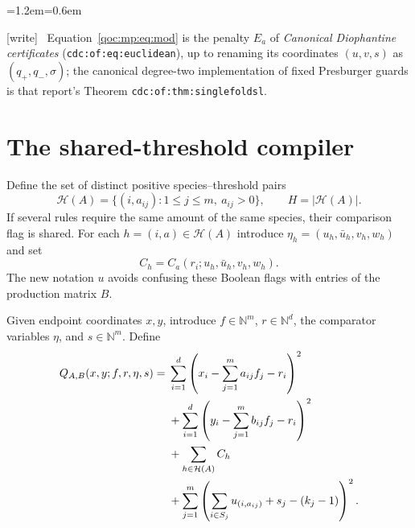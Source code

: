 \documentclass[11pt,letterpaper]{article}
\theoremstyle{definition}
\theoremstyle{remark}
\newcommand{\N}{\mathbb N}
\newcommand{\cH}{\mathcal H}
\newcommand{\wtag}{\textup{[write]}}
\newenvironment{writenote}{\par\smallskip\begin{list}{}{\leftmargin=1.2em\rightmargin=0.6em}\item[]\small\wtag\ }{\end{list}\smallskip}
\newcommand{\lab}[1]{\nolinkurl{#1}}
\begin{document}
\begin{writenote}
Equation~\eqref{qoc:mp:eq:mod} is the penalty $E_a$ of \emph{Canonical Diophantine certificates} (\lab{cdc:of:eq:euclidean}), up to renaming its coordinates $(u,v,s)$ as $(q_+,q_-,\sigma)$; the canonical degree-two implementation of fixed Presburger guards is that report's Theorem \lab{cdc:of:thm:singlefoldsl}.
\end{writenote}

\section{The shared-threshold compiler}\label{qoc:mp:sec:round}
Define the set of distinct positive species--threshold pairs
\begin{equation}\label{qoc:mp:eq:H}
 \cH(A)=\{(i,a_{ij}):1\le j\le m,\ a_{ij}>0\},\qquad H=|\cH(A)|.
\end{equation}
If several rules require the same amount of the same species, their
comparison flag is shared. For each $h=(i,a)\in\cH(A)$ introduce
$\eta_h=(u_h,\bar u_h,v_h,w_h)$ and set
\[
 C_h=C_a(r_i;u_h,\bar u_h,v_h,w_h).
\]
The new notation $u$ avoids confusing these Boolean flags with entries of
the production matrix $B$.

Given endpoint coordinates $x,y$, introduce $f\in\N^m$, $r\in\N^d$,
the comparator variables $\eta$, and $s\in\N^m$. Define
\begin{align}
 Q_{A,B}(x,y;f,r,\eta,s)
 ={}&\sum_{i=1}^d\left(x_i-\sum_{j=1}^m a_{ij}f_j-r_i\right)^2\notag\\
 &+\sum_{i=1}^d\left(y_i-\sum_{j=1}^m b_{ij}f_j-r_i\right)^2\notag\\
 &+\sum_{h\in\cH(A)} C_h\notag\\
 &+\sum_{j=1}^m
 \left(\sum_{i\in S_j}u_{(i,a_{ij})}+s_j-(k_j-1)\right)^2.
 \label{qoc:mp:eq:roundpoly}
\end{align}
\end{document}
